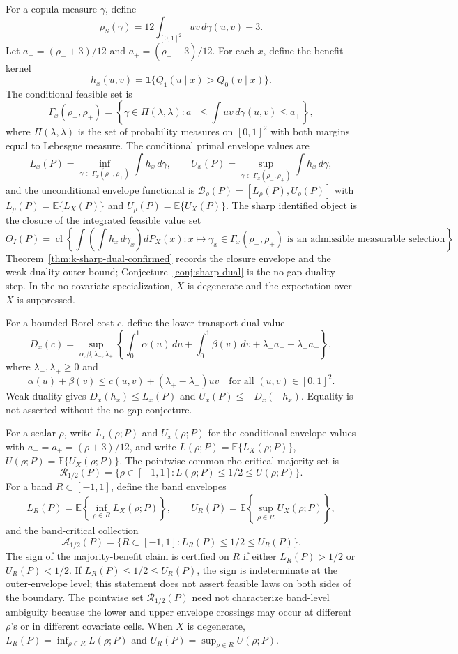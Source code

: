 \documentclass[11pt]{article}
\newcommand{\E}{\mathbb{E}}
\newcommand{\one}{\mathbf{1}}
\theoremstyle{definition}
\theoremstyle{plain}
\theoremstyle{remark}
\begin{document}
For a copula measure \(\gamma\), define
\[
\rho_S(\gamma)=12\int_{[0,1]^2}uv\,d\gamma(u,v)-3.
\]
Let \(a_-=(\rho_-+3)/12\) and \(a_+=(\rho_++3)/12\).  For each \(x\), define the benefit kernel
\[
h_x(u,v)=\one\{Q_1(u\mid x)>Q_0(v\mid x)\}.
\]
The conditional feasible set is
\[
\Gamma_x(\rho_-,\rho_+)=\left\{\gamma\in\Pi(\lambda,\lambda):a_-\le \int uv\,d\gamma(u,v)\le a_+\right\},
\]
where \(\Pi(\lambda,\lambda)\) is the set of probability measures on \([0,1]^2\) with both margins equal to Lebesgue measure.  The conditional primal envelope values are
\[
L_x(P)=\inf_{\gamma\in\Gamma_x(\rho_-,\rho_+)}\int h_x\,d\gamma,\qquad
U_x(P)=\sup_{\gamma\in\Gamma_x(\rho_-,\rho_+)}\int h_x\,d\gamma,
\]
and the unconditional envelope functional is \(\mathcal B_\rho(P)=[L_\rho(P),U_\rho(P)]\) with \(L_\rho(P)=\E\{L_X(P)\}\) and \(U_\rho(P)=\E\{U_X(P)\}\).  The sharp identified object is the closure of the integrated feasible value set
\[
\Theta_I(P)=\operatorname{cl}\left\{\int\left(\int h_x\,d\gamma_x\right)dP_X(x):
x\mapsto\gamma_x\in\Gamma_x(\rho_-,\rho_+)\text{ is an admissible measurable selection}\right\}.
\]
Theorem~\ref{thm:k-sharp-dual-confirmed} records the closure envelope and the weak-duality outer bound; Conjecture~\ref{conj:sharp-dual} is the no-gap duality step.  In the no-covariate specialization, \(X\) is degenerate and the expectation over \(X\) is suppressed.

For a bounded Borel cost \(c\), define the lower transport dual value
\[
D_x(c)=\sup_{\alpha,\beta,\lambda_-,\lambda_+}
\left\{\int_0^1\alpha(u)\,du+\int_0^1\beta(v)\,dv+\lambda_-a_- - \lambda_+a_+\right\},
\]
where \(\lambda_-,\lambda_+\ge0\) and
\[
\alpha(u)+\beta(v)\le c(u,v)+(\lambda_+-\lambda_-)uv
\quad\text{for all }(u,v)\in[0,1]^2.
\]
Weak duality gives \(D_x(h_x)\le L_x(P)\) and \(U_x(P)\le -D_x(-h_x)\).  Equality is not asserted without the no-gap conjecture.

For a scalar \(\rho\), write \(L_x(\rho;P)\) and \(U_x(\rho;P)\) for the conditional envelope values with \(a_- = a_+ =(\rho+3)/12\), and write \(L(\rho;P)=\E\{L_X(\rho;P)\}\), \(U(\rho;P)=\E\{U_X(\rho;P)\}\).  The pointwise common-rho critical majority set is
\[
\mathcal R_{1/2}(P)=\{\rho\in[-1,1]:L(\rho;P)\le 1/2\le U(\rho;P)\}.
\]
For a band \(R\subset[-1,1]\), define the band envelopes
\[
L_R(P)=\E\left\{\inf_{\rho\in R}L_X(\rho;P)\right\},\qquad
U_R(P)=\E\left\{\sup_{\rho\in R}U_X(\rho;P)\right\},
\]
and the band-critical collection
\[
\mathcal A_{1/2}(P)=\{R\subset[-1,1]:L_R(P)\le 1/2\le U_R(P)\}.
\]
The sign of the majority-benefit claim is certified on \(R\) if either \(L_R(P)>1/2\) or \(U_R(P)<1/2\).  If \(L_R(P)\le1/2\le U_R(P)\), the sign is indeterminate at the outer-envelope level; this statement does not assert feasible laws on both sides of the boundary.  The pointwise set \(\mathcal R_{1/2}(P)\) need not characterize band-level ambiguity because the lower and upper envelope crossings may occur at different \(\rho\)'s or in different covariate cells.  When \(X\) is degenerate, \(L_R(P)=\inf_{\rho\in R}L(\rho;P)\) and \(U_R(P)=\sup_{\rho\in R}U(\rho;P)\).
\end{document}
